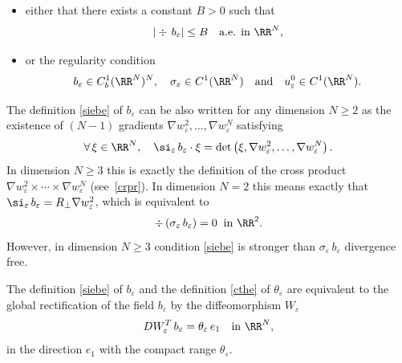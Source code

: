 \begin{itemize}
\item either that there exists a constant $B>0$ such that
\begin{equation}\label{beB}
|\div\,b_\varepsilon|\leq B\quad\mbox{a.e. in }\RR^N,
\end{equation}
\item or the regularity condition
\begin{equation}\label{rsiebe}
b_\varepsilon\in C^1_b(\RR^N)^N,\quad \sigma_\varepsilon\in C^1(\RR^N)\quad\mbox{and}\quad u_\varepsilon^0\in C^1(\RR^N).
\end{equation}
\end{itemize}
\begin{Rem}\label{rem.rec}
The definition \eqref{siebe} of $b_\varepsilon$ can be also written for any dimension $N\geq 2$ as the existence of $(N-1)$ gradients $\nabla w_\varepsilon^2,\dots,\nabla w_\varepsilon^N$ satisfying
\begin{equation}\label{siebe2}
\forall\,\xi\in\RR^N,\quad \si_\varepsilon\,b_\varepsilon\cdot\xi=\det\left(\xi,\nabla w_\varepsilon^2,\dots,\nabla w_\varepsilon^N\right).
\end{equation}
In dimension $N\geq 3$ this is exactly the definition of the cross product $\nabla w_\varepsilon^2\times\cdots\times\nabla w_\varepsilon^N$ (see~\eqref{crpr}). In dimension $N=2$ this means exactly that $\si_\varepsilon\,b_\varepsilon=R_\perp\nabla w_\varepsilon^2$, which is equivalent to
\begin{equation}\label{divsiebe}
\div\,(\sigma_\varepsilon\,b_\varepsilon)=0\;\;\mbox{in }\RR^2.
\end{equation}
However, in dimension $N\geq 3$ condition \eqref{siebe} is stronger than $\sigma_\varepsilon\,b_\varepsilon$ divergence free.

The definition \eqref{siebe} of $b_\varepsilon$ and the definition \eqref{cthe} of $\theta_\varepsilon$ are equivalent to the global rectification of the field $b_\varepsilon$ by the diffeomorphism $W_\varepsilon$
\begin{equation}\label{DWebe}
DW_\varepsilon^T\,b_\varepsilon=\theta_\varepsilon\,e_1\quad\mbox{in }\RR^N,
\end{equation}
in the direction $e_1$ with the compact range $\theta_\varepsilon$.
\end{Rem}

